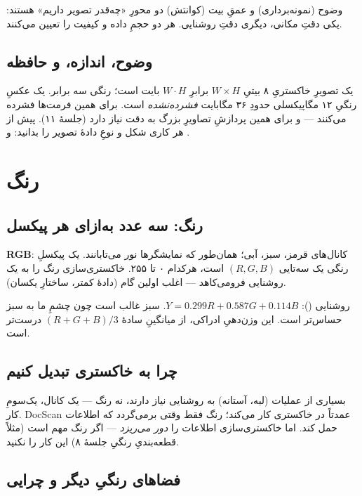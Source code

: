 \documentclass[12pt,a4paper]{article}
\begin{document}
\begin{yaddasht}
وضوح (نمونه‌برداری) و عمقِ بیت (کوانتش) دو محورِ «چه‌قدر تصویر داریم» هستند: یکی دقتِ مکانی،
دیگری دقتِ روشنایی. هر دو حجمِ داده و کیفیت را تعیین می‌کنند.
\end{yaddasht}

\subsection{وضوح، اندازه، و حافظه}

یک تصویرِ خاکستریِ ۸ بیتیِ $W\times H$ برابرِ $W\cdot H$ بایت است؛ رنگی سه برابر. یک عکسِ
رنگیِ ۱۲ مگاپیکسلی حدودِ ۳۶ مگابایت \emph{فشرده‌نشده} است. برای همین فرمت‌ها فشرده می‌کنند — و
برای همین پردازشِ تصاویرِ بزرگ به دقت نیاز دارد (جلسهٔ ۱۱). پیش از هر کاری شکل و نوعِ دادهٔ تصویر
را بدانید:  و .

\section{رنگ}

\subsection{رنگ: سه عدد به‌ازای هر پیکسل}

\textbf{RGB}: کانال‌های قرمز، سبز، آبی؛ همان‌طور که نمایشگرها نور می‌تابانند. یک پیکسلِ رنگی یک
سه‌تایی $(R,G,B)$ است، هرکدام ۰ تا ۲۵۵. خاکستری‌سازی رنگ را به یک روشنایی فرومی‌کاهد — اغلب اولین
گام (دادهٔ کمتر، ساختارِ یکسان).

\begin{riyazi}
روشنایی (): $Y = 0.299R + 0.587G + 0.114B$. سبز غالب است چون چشمِ ما به سبز
حساس‌تر است. این وزن‌دهیِ ادراکی، از میانگینِ سادهٔ $(R+G+B)/3$ درست‌تر است.
\end{riyazi}

\subsection{چرا به خاکستری تبدیل کنیم}

بسیاری از عملیات (لبه، آستانه) به روشنایی نیاز دارند، نه رنگ — یک کانال، یک‌سومِ کار. DocScan
عمدتاً در خاکستری کار می‌کند؛ رنگ فقط وقتی برمی‌گردد که اطلاعات حمل کند. اما خاکستری‌سازی اطلاعات
را \emph{دور می‌ریزد} — اگر رنگ مهم است (مثلاً قطعه‌بندیِ رنگیِ جلسهٔ ۸) این کار را نکنید.

\subsection{فضاهای رنگیِ دیگر و چرایی}
\end{document}
